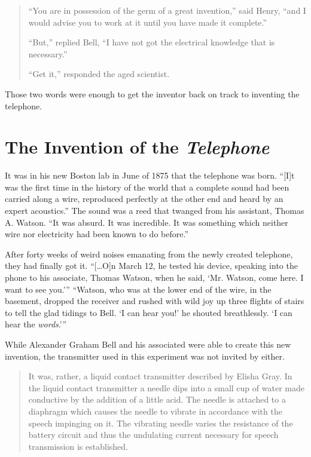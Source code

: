 \documentclass[12pt singlecol]{article}
\begin{document}
\begin{flushleft}
\begin{multicols}{2}
\begin{quotation}
``You are in possession of the germ of a great invention,'' said Henry, ``and I would advise you to work at it until you have made it complete.''

``But,'' replied Bell, ``I have not got the electrical knowledge that is necessary.''

``Get it,'' responded the aged scientist.\cite[p.~30]{Casson10}
\end{quotation}

Those two words were enough to get the inventor back on track to inventing the telephone.

\section{The Invention of the \emph{Telephone}}

It was in his new Boston lab in June of 1875 that the telephone was born. ``[I]t was the first time in the history of the world that a complete sound had been carried along a wire, reproduced perfectly at the other end and heard by an expert acoustics.'' \cite[p.~12]{Casson10} The sound was a reed that twanged from his assistant, Thomas A. Watson. ``It was absurd. It was incredible. It was something which neither wire nor electricity had been known to do before.'' \cite[p.~14]{Casson10}

After forty weeks of weird noises emanating from the newly created telephone, they had finally got it. ``[\ldots O]n March 12, he tested his device, speaking into the phone to his associate, Thomas Watson, when he said, `Mr. Watson, come here. I want to see you.''' \cite[para.~5]{MIT00} ``Watson, who was at the lower end of the wire, in the basement, dropped the receiver and rushed with wild joy up three flights of stairs to tell the glad tidings to Bell. `I can hear you!' he shouted breathlessly. `I can hear the \emph{words}.'''\cite[p.~32-33]{Casson10}

While Alexander Graham Bell and his associated were able to create this new invention, the transmitter used in this experiment was not invited by either. 

\begin{quotation}
It was, rather, a liquid contact transmitter described by Elisha Gray. In the liquid contact transmitter a needle dips into a small cup of water made conductive by the addition of a little acid. The needle is attached to a diaphragm which causes the needle to vibrate in accordance with the speech impinging on it. The vibrating needle varies the resistance of the battery circuit and thus the undulating current necessary for speech transmission is established. \cite[p.~2]{Coe95}
\end{quotation}


\end{multicols}
\end{flushleft}
\end{document}
